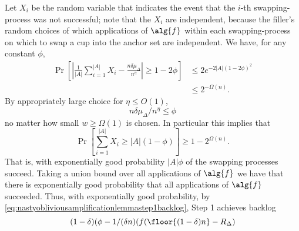 {  Let $X_i$ be the random variable that indicates the event that
  the $i$-th swapping-process was not successful; note that the
  $X_i$ are independent, because the filler's random choices of
  which applications of $\alg{f}$ within each swapping-process on
  which to swap a cup into the anchor set are independent.
  We have, for any constant $\phi$,
  \begin{align*}
  \Pr\left[\left|\frac{1}{|A|}\sum_{i=1}^{|A|}X_i - \frac{n\delta\mu_\Delta}{n^{\eta}}\right| \ge 1-2\phi \right] 
  &\le 2e^{-2|A|(1-2\phi)^2} \\
  &\le 2^{-\Omega(n)}.
  \end{align*}
  By appropriately large choice for $\eta \le O(1)$, $$n\delta\mu_\Delta / n^\eta
  \le \phi$$ no matter how small $w \ge \Omega(1)$ is chosen. In particular this
  implies that $$\Pr\left[\sum_{i=1}^{|A|} X_i \ge |A|(1-\phi)\right] \ge 1-2^{\Omega(n)}.$$
  That is, with exponentially good probability $|A|\phi$ of the swapping processes succeed.
  Taking a union bound over all applications of $\alg{f}$ we have
  that there is exponentially good probability that all
  applications of $\alg{f}$ succeeded. Thus, with exponentially
  good probability, by \eqref{eq:nastyobliviousamplificationlemmastep1backlog}, Step 1 achieves
  backlog $$(1-\delta)(\phi-1/(\delta n)(f(\floor{(1-\delta)n}-R_\Delta)$$

}
